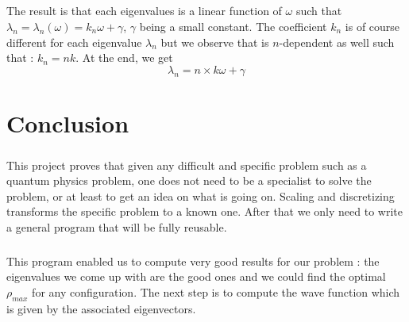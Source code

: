 \documentclass[a4paper, twoside, 11pt]{report}
\theoremstyle{theorem}
\theoremstyle{remark}
\theoremstyle{exemple}
\begin{document}
		
		\paragraph{}The result is that each eigenvalues is a linear function of $\omega$ such that ${\lambda}_{n}={\lambda}_{n}(\omega)={k}_{n}\omega+\gamma$, $\gamma$ being a small constant. The coefficient ${k}_{n}$ is of course different for each eigenvalue ${\lambda}_{n}$ but we observe that is $n$-dependent as well such that : ${k}_{n}=nk$. At the end, we get 
			\begin{equation}
				{\lambda}_{n}=n\times k\omega+\gamma
			\tag{10}
			\end{equation}
		
		
\chapter*{Conclusion}

	\paragraph{}This project proves that given any difficult and specific problem such as a quantum physics problem, one does not need to be a specialist to solve the problem, or at least to get an idea on what is going on. Scaling and discretizing transforms the specific problem to a known one. After that we only need to write a general program that will be fully reusable.
	
	\paragraph{}This program enabled us to compute very good results for our problem : the eigenvalues we come up with are the good ones and we could find the optimal ${\rho}_{max}$ for any configuration. The next step is to compute the wave function which is given by the associated eigenvectors.
        

        
\begin{flushleft}		
\nocite{*}

\end{flushleft}        	
        	
        	
        	
        	
    
    
    
	
	
\end{document}
